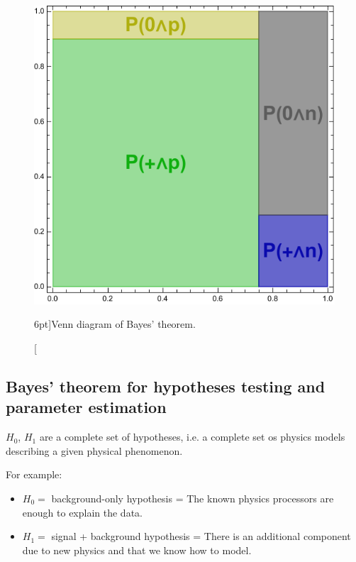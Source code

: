 \begin{figure}
	\includegraphics{probability/Bayes__theorem.pdf}
	\caption[Venn diagram of Bayes' theorem.][6pt]{Venn diagram of Bayes' theorem.}
	\label{fig:Bayes__theorem_proton}
\end{figure}

\subsection{Bayes' theorem for hypotheses testing and parameter estimation}
\label{subsec:bayes__hypo}

 $H_{0}$, $H_{1}$ are a complete set of hypotheses, i.e. a complete set os physics models describing a given physical phenomenon. 

For example:

\begin{itemize}
	\item $H_{0} = $ background-only hypothesis = The known physics processors are enough to explain the data.
	\item $H_{1} = $ signal + background hypothesis = There is an additional component due to new physics and that we know how to model.
\end{itemize}

